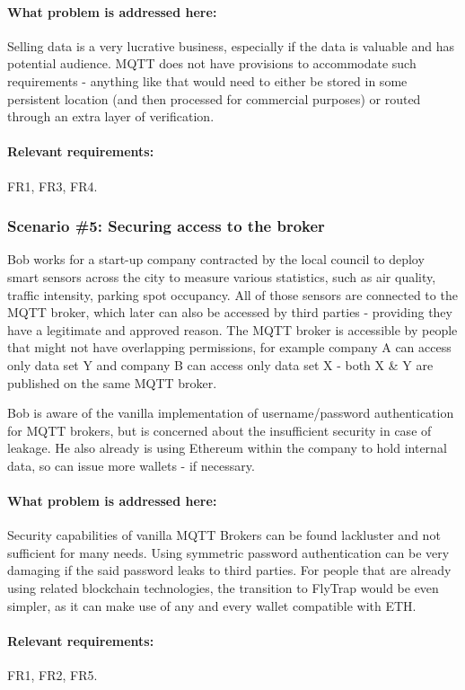 \paragraph{\textbf{What problem is addressed here:}}
Selling data is a very lucrative business, especially if the data is valuable and has potential audience. MQTT does not have provisions to accommodate such requirements - anything like that would need to either be stored in some persistent location (and then processed for commercial purposes) or routed through an extra layer of verification.
\paragraph{\textbf{Relevant requirements:}} FR1, FR3, FR4.
\\
\subsubsection{Scenario \#5: Securing access to the broker}
Bob works for a start-up company contracted by the local council to deploy smart sensors across the city to measure various statistics, such as air quality, traffic intensity, parking spot occupancy. All of those sensors are connected to the MQTT broker, which later can also be accessed by third parties - providing they have a legitimate and approved reason. The MQTT broker is accessible by people that might not have overlapping permissions, for example company A can access only data set Y and company B can access only data set X - both X \& Y are published on the same MQTT broker.

Bob is aware of the vanilla implementation of username/password authentication for MQTT brokers, but is concerned about the insufficient security in case of leakage. He also already is using Ethereum within the company to hold internal data, so can issue more wallets - if necessary.
\paragraph{\textbf{What problem is addressed here:}}
Security capabilities of vanilla MQTT Brokers can be found lackluster and not sufficient for many needs. Using symmetric password authentication can be very damaging if the said password leaks to third parties. For people that are already using related blockchain technologies, the transition to FlyTrap would be even simpler, as it can make use of any and every wallet compatible with ETH.
\paragraph{\textbf{Relevant requirements:}} FR1, FR2, FR5.
